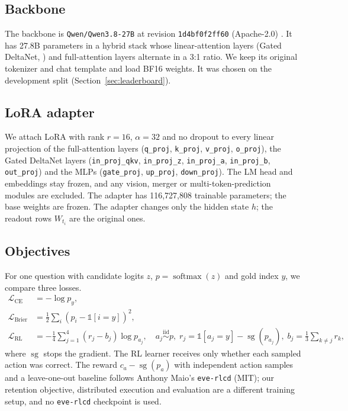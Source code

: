 \subsection{Backbone}
\label{sec:backbone}

The backbone is \texttt{Qwen/Qwen3.8-27B} at revision \texttt{1d4bf0f2ff60}
(Apache-2.0) \citep{qwen38_27b}. It has 27.8B parameters in a hybrid stack whose
linear-attention layers (Gated DeltaNet, \citealp{yang2024gdn}) and full-attention layers
alternate in a 3:1 ratio. We keep its original tokenizer and chat template and load BF16
weights. It was chosen on the development split (Section~\ref{sec:leaderboard}).

\subsection{LoRA adapter}
\label{sec:lora}

We attach LoRA \citep{hu2021lora} with rank $r=16$, $\alpha=32$ and no dropout to every
linear projection of the full-attention layers (\texttt{q\_proj}, \texttt{k\_proj},
\texttt{v\_proj}, \texttt{o\_proj}), the Gated DeltaNet layers (\texttt{in\_proj\_qkv},
\texttt{in\_proj\_z}, \texttt{in\_proj\_a}, \texttt{in\_proj\_b}, \texttt{out\_proj}) and
the MLPs (\texttt{gate\_proj}, \texttt{up\_proj}, \texttt{down\_proj}). The LM head and
embeddings stay frozen, and any vision, merger or multi-token-prediction modules are
excluded. The adapter has 116,727,808 trainable parameters; the base weights are frozen.
The adapter changes only the hidden state $h$; the readout rows $W_{t_i}$ are the original
ones.

\subsection{Objectives}
\label{sec:objectives}

For one question with candidate logits $z$, $p=\operatorname{softmax}(z)$ and gold index
$y$, we compare three losses.
\begin{align}
  \mathcal{L}_{\text{CE}} &= -\log p_y, \\
  \mathcal{L}_{\text{Brier}} &= \tfrac12 \textstyle\sum_i \left(p_i - \mathbb{1}[i=y]\right)^2, \\
  \mathcal{L}_{\text{RL}} &= -\tfrac14 \textstyle\sum_{j=1}^{4} (r_j - b_j)\log p_{a_j},
  \quad a_j \overset{\text{iid}}{\sim} p,\;
  r_j = \mathbb{1}[a_j=y] - \operatorname{sg}(p_{a_j}),\;
  b_j = \tfrac13 \textstyle\sum_{k\neq j} r_k ,
\end{align}
where $\operatorname{sg}$ stops the gradient. The RL learner receives only whether each
sampled action was correct. The reward $c_a - \operatorname{sg}(p_a)$ with independent action
samples and a leave-one-out baseline follows Anthony Maio's \texttt{eve-rlcd}
\citep{maio2026evercld} (MIT); our retention objective, distributed execution and evaluation
are a different training setup, and no \texttt{eve-rlcd} checkpoint is used.

